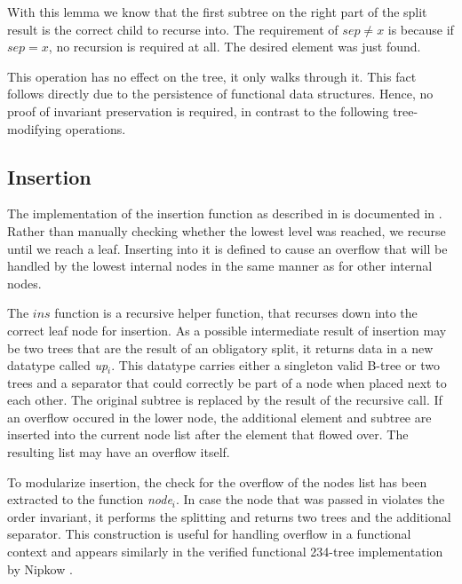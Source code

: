 With this lemma we know that the first subtree
on the right part of the split result
is the correct child to recurse into.
The requirement of $sep \neq x$ is because if $sep = x$,
no recursion is required at all.
The desired element was just found.

This operation has no effect on the tree, it only walks through it.
This fact follows directly due to the persistence of functional data structures.
Hence, no proof of invariant preservation is required,
in contrast to the following tree-modifying operations.

\subsection{Insertion}
\label{sec:abs-ins}



The implementation of the insertion function
as described in  is documented in .
Rather than manually checking whether the lowest level was reached,
we recurse until we reach a leaf.
Inserting into it is defined to cause an overflow that will be handled
by the lowest internal nodes in the same manner as for other internal nodes.

The $ins$ function is a recursive helper function,
that recurses down into the correct leaf node for insertion.
As a possible intermediate result of insertion
may be two trees that are the result of an obligatory split,
it returns data in a new datatype called \textit{up}$_i$.
This datatype carries either a singleton valid B-tree or two trees and a separator
that could correctly be part of a node when placed next to each other.
The original subtree is replaced by
the result of the recursive call.
If an overflow occured in the lower node, the additional element and
subtree are inserted into the current node list
after the element that flowed over.
The resulting list may have an overflow itself.

To modularize insertion, the check for the overflow of
the nodes list has been
extracted to the function \textit{node}$_i$.
In case the node that was passed in violates the order invariant,
it performs the splitting and returns two trees and the additional separator.
This construction is useful for handling overflow
in a functional context and appears similarly in the
verified functional 234-tree implementation by Nipkow \parencite{DBLP:conf/itp/Nipkow16}.

